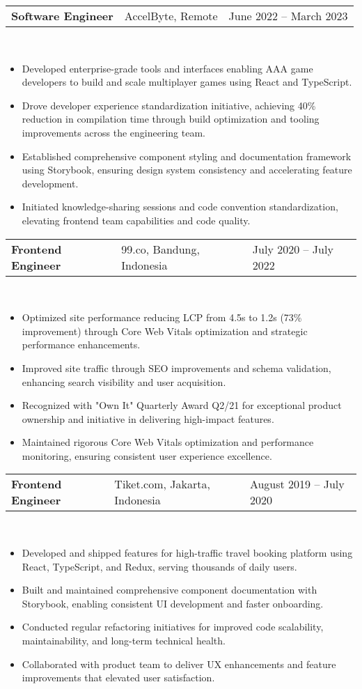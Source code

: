 \documentclass[a4paper, 11pt]{article}
\newcommand{\resumeItem}[1]{
  \item\small{
    {#1 \vspace{-2pt}}
  }
}
\newcommand{\resumeSubheading}[4]{
  \vspace{-2pt}\item
    \begin{tabularx}{0.987\textwidth}[t]{
  >{\raggedright\arraybackslash}X
  >{\centering\arraybackslash}X
  >{\raggedleft\arraybackslash}X }
      \textbf{#1} & #2 & #3 \\
    \end{tabularx}
    \textit{\small#4}\\
    \vspace{-7pt}
}
\newcommand{\resumeItemListStart}{\begin{itemize}[leftmargin=0.22in]}
\newcommand{\resumeItemListEnd}{\end{itemize}\vspace{-20pt}}
\begin{document}
        \resumeSubheading
            {Software Engineer}{AccelByte, Remote}{June 2022 -- March 2023}{}
            \resumeItemListStart
                \resumeItem{Developed enterprise-grade tools and interfaces enabling AAA game developers to build and scale multiplayer games using React and TypeScript.}
                \resumeItem{Drove developer experience standardization initiative, achieving 40\% reduction in compilation time through build optimization and tooling improvements across the engineering team.}
                \resumeItem{Established comprehensive component styling and documentation framework using Storybook, ensuring design system consistency and accelerating feature development.}
                \resumeItem{Initiated knowledge-sharing sessions and code convention standardization, elevating frontend team capabilities and code quality.}
            \resumeItemListEnd

        \resumeSubheading
            {Frontend Engineer}{99.co, Bandung, Indonesia}{July 2020 -- July 2022}{}
            \resumeItemListStart
                \resumeItem{Optimized site performance reducing LCP from 4.5s to 1.2s (73\% improvement) through Core Web Vitals optimization and strategic performance enhancements.}
                \resumeItem{Improved site traffic through SEO improvements and schema validation, enhancing search visibility and user acquisition.}
                \resumeItem{Recognized with "Own It" Quarterly Award Q2/21 for exceptional product ownership and initiative in delivering high-impact features.}
                \resumeItem{Maintained rigorous Core Web Vitals optimization and performance monitoring, ensuring consistent user experience excellence.}
            \resumeItemListEnd

        \resumeSubheading
            {Frontend Engineer}{Tiket.com, Jakarta, Indonesia}{August 2019 -- July 2020}{}
            \resumeItemListStart
                \resumeItem{Developed and shipped features for high-traffic travel booking platform using React, TypeScript, and Redux, serving thousands of daily users.}
                \resumeItem{Built and maintained comprehensive component documentation with Storybook, enabling consistent UI development and faster onboarding.}
                \resumeItem{Conducted regular refactoring initiatives for improved code scalability, maintainability, and long-term technical health.}
                \resumeItem{Collaborated with product team to deliver UX enhancements and feature improvements that elevated user satisfaction.}
            \resumeItemListEnd
\end{document}
